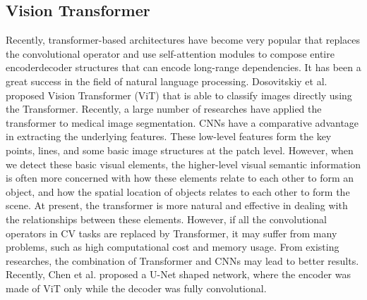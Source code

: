 \subsection{Vision Transformer}
Recently, transformer-based architectures have become very popular that replaces
the convolutional operator and use self-attention modules to compose entire
encoderdecoder structures that can encode long-range dependencies.
It has been a great success in the field of natural language processing.
Dosovitskiy et al. proposed Vision Transformer (ViT) that is able to classify
images directly using the Transformer.
Recently, a large number of researches have applied the transformer to medical
image segmentation. CNNs have a comparative advantage in extracting the
underlying features. These low-level features form the key points, lines, and
some basic image structures at the patch level. However, when we detect these
basic visual elements, the higher-level visual semantic information is often
more concerned with how these elements relate to each other to form an object,
and how the spatial location of objects relates to each other to form the scene.
At present, the transformer is more natural and effective in dealing with the
relationships between these elements. However, if all the convolutional
operators in CV tasks are replaced by Transformer, it may suffer from many
problems, such as high computational cost and memory usage. From existing
researches, the combination of Transformer and CNNs may lead to better results.
Recently, Chen et al. proposed a U-Net shaped network, where the encoder was
made of ViT only while the decoder was fully convolutional.



